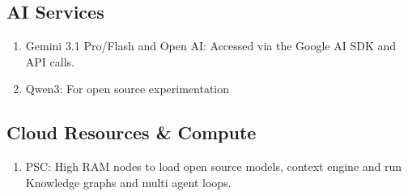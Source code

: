 \subsection{AI Services}
    \begin{enumerate}
        \item Gemini 3.1 Pro/Flash and Open AI: Accessed via the Google AI SDK and API calls. 
        \item Qwen3: For open source experimentation 
    \end{enumerate}
\subsection{Cloud Resources \& Compute}
\begin{enumerate}
        \item PSC: High RAM nodes to load open source models, context engine and run Knowledge graphs and multi agent loops. 
    \end{enumerate}
    
